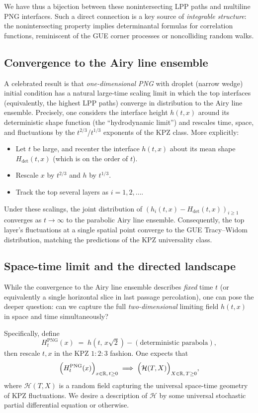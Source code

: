 \documentclass[letterpaper,11pt,oneside,reqno]{article}
\numberwithin{equation}{section}
\theoremstyle{definition}
\begin{document}
We have thus a bijection between these nonintersecting LPP paths and multiline PNG interfaces. Such a direct connection is a key source of \emph{integrable structure}: the nonintersecting property implies determinantal formulas for correlation functions, reminiscent of the GUE corner processes or noncolliding random walks.

\subsection{Convergence to the Airy line ensemble}
\label{sub:PNG-airy-convergence}
A celebrated result is that \emph{one-dimensional PNG} with droplet (narrow wedge) initial condition has a natural large-time scaling limit in which the top interfaces (equivalently, the highest LPP paths) converge in distribution to the Airy line ensemble. Precisely, one considers the interface height $h(t,x)$ around its deterministic shape function (the “hydrodynamic limit”) and rescales time, space, and fluctuations by the $t^{2/3}$/$t^{1/3}$ exponents of the KPZ class. More explicitly:

\begin{itemize}
\item Let $t$ be large, and recenter the interface $h(t,x)$ about its mean shape $H_{\text{det}}(t,x)$ (which is on the order of $t$).
\item Rescale $x$ by $t^{2/3}$ and $h$ by $t^{1/3}$.
\item Track the top several layers as $i=1,2,\dots$.
\end{itemize}
Under these scalings, the joint distribution of $(h_i(t,x) - H_{\text{det}}(t,x))_{i\ge1}$ converges as $t\to\infty$ to the parabolic Airy line ensemble. Consequently, the top layer’s fluctuations at a single spatial point converge to the GUE Tracy--Widom distribution, matching the predictions of the KPZ universality class.

\subsection{Space-time limit and the directed landscape}
\label{sub:space-time-limit}
While the convergence to the Airy line ensemble describes \emph{fixed} time $t$ (or equivalently a single horizontal slice in last passage percolation), one can pose the deeper question: can we capture the full \emph{two-dimensional} limiting field $h(t,x)$ in space and time simultaneously?

Specifically, define
\[
H^\mathrm{PNG}_t(x) \;=\; h(t,\,x\sqrt{2}) - (\text{deterministic parabola}),
\]
then rescale $t,x$ in the KPZ $1:2:3$ fashion. One expects that
\[
\Bigl(H^\mathrm{PNG}_t(x)\Bigr)_{x\in\mathbb{R},\,t\ge0}
\;\Longrightarrow\;
\Bigl(\mathcal{H}(T,X)\Bigr)_{X\in\mathbb{R},\,T\ge0},
\]
where $\mathcal{H}(T,X)$ is a random field capturing the universal space-time geometry of KPZ fluctuations. We desire a description of $\mathcal{H}$ by some universal stochastic partial differential equation or otherwise.
\end{document}
